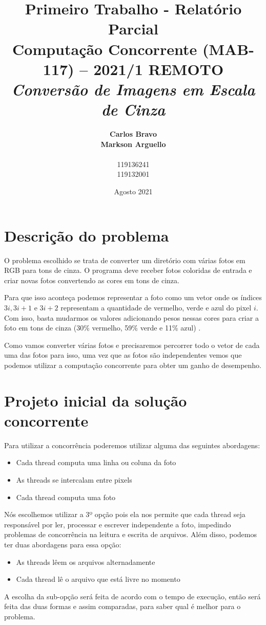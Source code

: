 \documentclass{article}
\title{
    \textbf{Primeiro Trabalho - Relatório Parcial} \\
     { \large \textbf{Computação Concorrente (MAB-117) -- 2021/1 REMOTO}} \\ 
   \textit{\textbf{Conversão de Imagens em Escala de Cinza}}
    }
\author{\textbf{Carlos Bravo} \\ \textbf{Markson Arguello} \\ \\ 119136241 \\  119132001}
\date{Agosto 2021}
\begin{document}
\maketitle

\section{Descrição do problema}
    O problema escolhido se trata de converter um diretório com várias fotos em RGB para tons de cinza. O programa deve receber fotos coloridas de entrada e criar novas fotos convertendo as cores em tons de cinza. 
    
    Para que isso aconteça podemos representar a foto como um vetor onde os índices \(3i, 3i + 1 \text{ e } 3i + 2\) representam a quantidade de vermelho, verde e azul do pixel \(i\). Com isso, basta mudarmos os valores adicionando pesos nessas cores para criar a foto em tons de cinza (30\% vermelho, 59\% verde e 11\% azul) \cite{wikiGray}. 
    
    Como vamos converter várias fotos e precisaremos percorrer todo o vetor de cada uma das fotos para isso, uma vez que as fotos são independentes vemos que podemos utilizar a computação concorrente para obter um ganho de desempenho.
    
    
\section{Projeto inicial da solução concorrente}
    Para utilizar a concorrência poderemos utilizar alguma das seguintes abordagens:
     \begin{itemize}
        \item Cada thread computa uma linha ou coluna da foto
        \item As threads se intercalam entre pixels
        \item Cada thread computa uma foto
    \end{itemize}
    Nós escolhemos utilizar a 3º opção pois ela nos permite que cada thread seja responsável por ler, processar e escrever independente a foto, impedindo problemas de concorrência na leitura e escrita de arquivos. Além disso, podemos ter duas abordagens para essa opção:
    \begin{itemize}
        \item As threads lêem os arquivos alternadamente
        \item Cada thread lê o arquivo que está livre no momento
    \end{itemize}
    A escolha da sub-opção será feita de acordo com o tempo de execução, então será feita das duas formas e assim comparadas, para saber qual é melhor para o problema.
    
\end{document}
